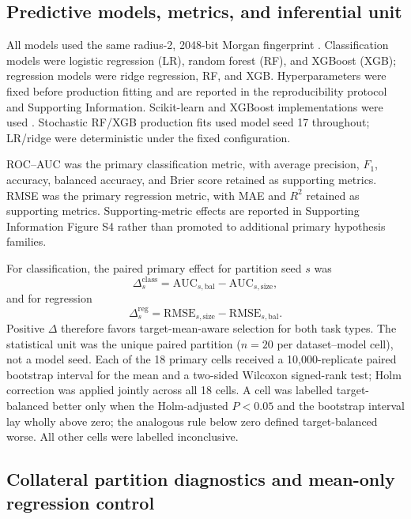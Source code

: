 \subsection{Predictive models, metrics, and inferential unit}

All models used the same radius-2, 2048-bit Morgan fingerprint \citep{rogers2010extended}. Classification models were logistic regression (LR), random forest (RF), and XGBoost (XGB); regression models were ridge regression, RF, and XGB. Hyperparameters were fixed before production fitting and are reported in the reproducibility protocol and Supporting Information. Scikit-learn and XGBoost implementations were used \citep{pedregosa2011scikit,breiman2001random,chen2016xgboost}. Stochastic RF/XGB production fits used model seed 17 throughout; LR/ridge were deterministic under the fixed configuration.

ROC--AUC was the primary classification metric, with average precision, $F_1$, accuracy, balanced accuracy, and Brier score retained as supporting metrics. RMSE was the primary regression metric, with MAE and $R^2$ retained as supporting metrics. Supporting-metric effects are reported in Supporting Information Figure S4 rather than promoted to additional primary hypothesis families.

For classification, the paired primary effect for partition seed $s$ was
\begin{equation}
 \Delta_s^{\mathrm{class}}=\mathrm{AUC}_{s,\mathrm{bal}}-\mathrm{AUC}_{s,\mathrm{size}},
 \label{eq:class-effect}
\end{equation}
and for regression
\begin{equation}
 \Delta_s^{\mathrm{reg}}=\mathrm{RMSE}_{s,\mathrm{size}}-\mathrm{RMSE}_{s,\mathrm{bal}}.
 \label{eq:reg-effect}
\end{equation}
Positive $\Delta$ therefore favors target-mean-aware selection for both task types. The statistical unit was the unique paired partition ($n=20$ per dataset--model cell), not a model seed. Each of the 18 primary cells received a 10,000-replicate paired bootstrap interval for the mean and a two-sided Wilcoxon signed-rank test; Holm correction was applied jointly across all 18 cells. A cell was labelled target-balanced better only when the Holm-adjusted $P<0.05$ and the bootstrap interval lay wholly above zero; the analogous rule below zero defined target-balanced worse. All other cells were labelled inconclusive.

\subsection{Collateral partition diagnostics and mean-only regression control}

